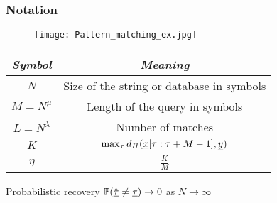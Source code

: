 \begin{frame}\frametitle{Notation}

	\begin{figure}[t]
		\centering
		\texttt{[image: Pattern\_matching\_ex.jpg]}
	\end{figure}
	\vspace{-8pt}
	{\small
	\begin{table}[h!]
		\label{Table:Notations3}
		\begin{center}
			\begin{tabular}{|c|c|} 	
				\hline		
				\textit{Symbol}		&  \textit{Meaning} \\		
				\hline
				$N$           		& Size of the string or database in symbols \\
				\hline
				$M = N^{\mu}$       & Length of the query in symbols \\
				\hline
				$L = N^\lambda$    &   Number of matches \\
				\hline
				$K$             &$\max_{\tau}d_{H}(\underline{x}[\tau:\tau+M-1],\underline{y})$\\
				\hline
				$\eta$             &$\frac{K}{M}$\\
				\hline
			\end{tabular}
		\end{center}
	\end{table}
    }
    \begin{block}{Probabilistic recovery}
    $\mathbb{P}(\hat{\underline{\tau}} \neq \underline{\tau}) \rightarrow 0$ as $N \rightarrow \infty$
    \end{block}
	\end{frame}	
